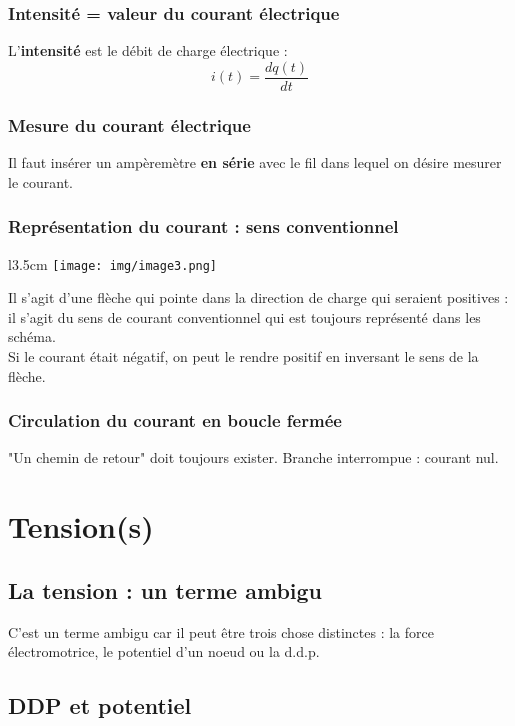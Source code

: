 \documentclass[british,french,11pt, a4paper, openany]{book}
\begin{document}
		\subsubsection{Intensité = valeur du courant électrique}
		L'\textbf{intensité} est le débit de charge électrique :
		\begin{equation}
		i(t) = \frac{dq(t)}{dt}
		\end{equation}
		
		\subsubsection{Mesure du courant électrique}
		Il faut insérer un ampèremètre \textbf{en série} avec le fil dans lequel on désire mesurer le courant.
		
		\subsubsection{Représentation du courant : sens conventionnel}
		\begin{wrapfigure}[5]{l}{3.5cm}
			\texttt{[image: img/image3.png]}
		\end{wrapfigure}
		Il s'agit d'une flèche qui pointe dans la direction de charge qui seraient positives : il s'agit du sens de courant conventionnel qui est toujours représenté dans les schéma.\\
		Si le courant était négatif, on peut le rendre positif en inversant le sens de la flèche.
		
		\subsubsection{Circulation du courant en boucle fermée}
		"Un chemin de retour" doit toujours exister. Branche interrompue : courant nul.
		
		\section{Tension(s)}
		\subsection{La tension : un terme ambigu}
		C'est un terme ambigu car il peut être trois chose distinctes : la force électromotrice, le potentiel d'un noeud ou la d.d.p.
		
		\subsection{DDP et potentiel}
\end{document}
